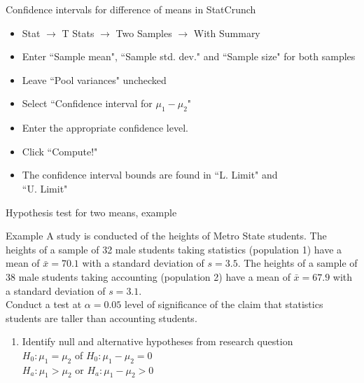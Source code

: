 \documentclass[xcolor=table]{beamer}
\begin{document}
\begin{frame}{Confidence intervals for difference of means in StatCrunch}

\begin{block}{}
\large
\begin{itemize}
\item Stat $\to$ T Stats $\to$ Two Samples $\to$ With Summary
\item Enter ``Sample mean", ``Sample std. dev." and ``Sample size" for both samples
\item Leave ``Pool variances" unchecked
\item Select ``Confidence interval for $\mu_1 - \mu_2$"
\item Enter the appropriate confidence level.
\item Click ``Compute!"
\item The confidence interval bounds are found in ``L. Limit" and\\ ``U. Limit"
\end{itemize}
\end{block}

\end{frame}

\begin{frame}{Hypothesis test for two means, example}
\begin{exampleblock}{Example}
\large
A study is conducted of the heights of Metro State students. The heights of a sample of 32 male students taking statistics (population 1) have a mean of $\bar x = 70.1$ with a standard deviation of $s=3.5$. The heights of a sample of 38 male students taking accounting (population 2) have a mean of $\bar x = 67.9$ with a standard deviation of $s=3.1$.\\
\medskip
Conduct a test at $\alpha=0.05$ level of significance of the claim that statistics students are taller than accounting students.
\begin{enumerate}
\pause\item Identify null and alternative hypotheses from research question\\
\pause$H_0: \mu_1 = \mu_2$ of $H_0: \mu_1 - \mu_2 = 0$\\
$H_a: \mu_1 > \mu_2$ or $H_a: \mu_1 - \mu_2 > 0$\\
\end{enumerate}
\end{exampleblock}
\end{frame}
\end{document}

